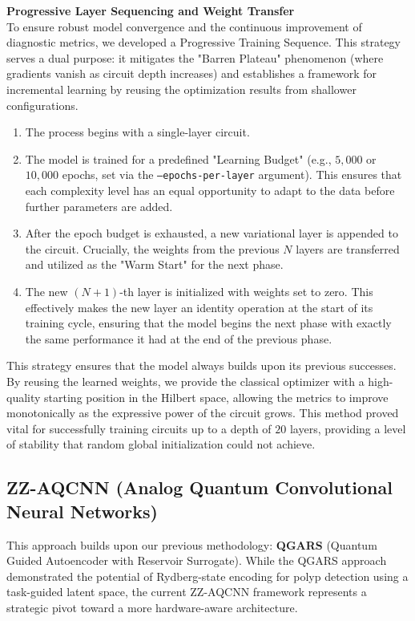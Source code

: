 \documentclass{oqireport}
\begin{document}
{\large \textbf{Progressive Layer Sequencing and Weight Transfer}} \\
To ensure robust model convergence and the continuous improvement of diagnostic metrics, we developed a Progressive Training Sequence. This strategy serves a dual purpose: it mitigates the "Barren Plateau" phenomenon (where gradients vanish as circuit depth increases) and establishes a framework for incremental learning by reusing the optimization results from shallower configurations.
\begin{enumerate}
    \item The process begins with a single-layer circuit. 
    \item The model is trained for a predefined "Learning Budget" (e.g., $5,000$ or $10,000$ epochs, set via the \texttt{--epochs-per-layer} argument). This ensures that each complexity level has an equal opportunity to adapt to the data before further parameters are added.
    \item After the epoch budget is exhausted, a new variational layer is appended to the circuit. Crucially, the weights from the previous $N$ layers are transferred and utilized as the "Warm Start" for the next phase.
    \item The new $(N+1)$-th layer is initialized with weights set to zero. This effectively makes the new layer an identity operation at the start of its training cycle, ensuring that the model begins the next phase with exactly the same performance it had at the end of the previous phase.
\end{enumerate}
This strategy ensures that the model always builds upon its previous successes. By reusing the learned weights, we provide the classical optimizer with a high-quality starting position in the Hilbert space, allowing the metrics to improve monotonically as the expressive power of the circuit grows. This method proved vital for successfully training circuits up to a depth of $20$ layers, providing a level of stability that random global initialization could not achieve.

\subsection{ZZ-AQCNN (Analog Quantum Convolutional Neural Networks)}
This approach builds upon our previous methodology: \textbf{QGARS} (Quantum Guided Autoencoder with Reservoir Surrogate). While the QGARS approach demonstrated the potential of Rydberg-state encoding for polyp detection using a task-guided latent space, the current ZZ-AQCNN framework represents a strategic pivot toward a more hardware-aware architecture.
\end{document}
